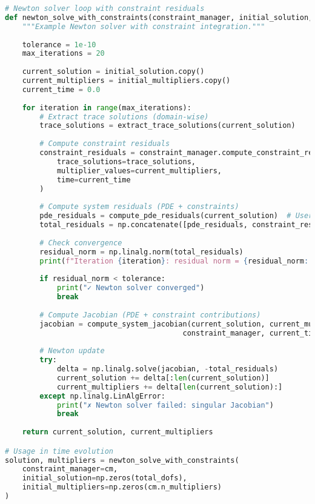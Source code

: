 \begin{lstlisting}[language=Python, caption=Newton Solver Integration Example]
# Newton solver loop with constraint residuals
def newton_solve_with_constraints(constraint_manager, initial_solution, initial_multipliers):
    """Example Newton solver with constraint integration."""
    
    tolerance = 1e-10
    max_iterations = 20
    
    current_solution = initial_solution.copy()
    current_multipliers = initial_multipliers.copy()
    current_time = 0.0
    
    for iteration in range(max_iterations):
        # Extract trace solutions (domain-wise)
        trace_solutions = extract_trace_solutions(current_solution)
        
        # Compute constraint residuals
        constraint_residuals = constraint_manager.compute_constraint_residuals(
            trace_solutions=trace_solutions,
            multiplier_values=current_multipliers,
            time=current_time
        )
        
        # Compute system residuals (PDE + constraints)
        pde_residuals = compute_pde_residuals(current_solution)  # User function
        total_residuals = np.concatenate([pde_residuals, constraint_residuals])
        
        # Check convergence
        residual_norm = np.linalg.norm(total_residuals)
        print(f"Iteration {iteration}: residual norm = {residual_norm:.6e}")
        
        if residual_norm < tolerance:
            print("✓ Newton solver converged")
            break
        
        # Compute Jacobian (PDE + constraint contributions)
        jacobian = compute_system_jacobian(current_solution, current_multipliers, 
                                         constraint_manager, current_time)
        
        # Newton update
        try:
            delta = np.linalg.solve(jacobian, -total_residuals)
            current_solution += delta[:len(current_solution)]
            current_multipliers += delta[len(current_solution):]
        except np.linalg.LinAlgError:
            print("✗ Newton solver failed: singular Jacobian")
            break
    
    return current_solution, current_multipliers

# Usage in time evolution
solution, multipliers = newton_solve_with_constraints(
    constraint_manager=cm,
    initial_solution=np.zeros(total_dofs),
    initial_multipliers=np.zeros(cm.n_multipliers)
)
\end{lstlisting}

